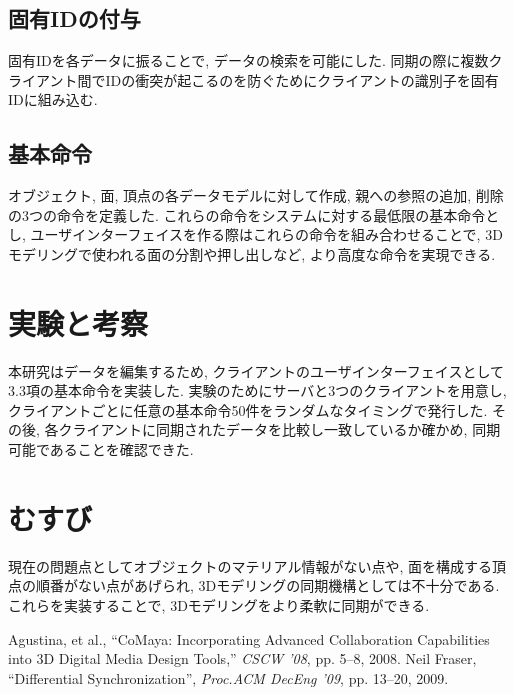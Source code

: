 \documentclass{AIabst}
\begin{document}
	\subsection{固有IDの付与}
	固有IDを各データに振ることで, データの検索を可能にした. 同期の際に複数クライアント間でIDの衝突が起こるのを防ぐためにクライアントの識別子を固有IDに組み込む.
	\subsection{基本命令}
	オブジェクト, 面, 頂点の各データモデルに対して作成, 親への参照の追加, 削除の3つの命令を定義した.
	これらの命令をシステムに対する最低限の基本命令とし, ユーザインターフェイスを作る際はこれらの命令を組み合わせることで, 3Dモデリングで使われる面の分割や押し出しなど, より高度な命令を実現できる.
\section{実験と考察}
本研究はデータを編集するため, クライアントのユーザインターフェイスとして3.3項の基本命令を実装した.
実験のためにサーバと3つのクライアントを用意し, クライアントごとに任意の基本命令50件をランダムなタイミングで発行した.
 その後, 各クライアントに同期されたデータを比較し一致しているか確かめ, 同期可能であることを確認できた.
\section{むすび}
 現在の問題点としてオブジェクトのマテリアル情報がない点や, 面を構成する頂点の順番がない点があげられ, 3Dモデリングの同期機構としては不十分である.
これらを実装することで, 3Dモデリングをより柔軟に同期ができる.

\begin{thebibliography}{9}
	Agustina, et al., ``CoMaya: Incorporating Advanced Collaboration Capabilities into 3D Digital Media Design Tools,'' {\it CSCW '08}, pp. 5--8, 2008.
  Neil Fraser,	``Differential Synchronization'',  {\it Proc.ACM DecEng '09}, pp. 13--20, 2009.
\end{thebibliography}
\end{document}
